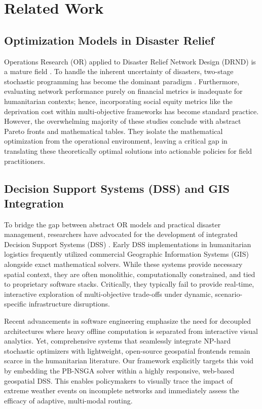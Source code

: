 \documentclass[conference]{IEEEtran}
\begin{document}
\section{Related Work}

\subsection{Optimization Models in Disaster Relief}
Operations Research (OR) applied to Disaster Relief Network Design (DRND) is a mature field \cite{altay2006or}. To handle the inherent uncertainty of disasters, two-stage stochastic programming has become the dominant paradigm \cite{tofighi2016humanitarian, Yahyaei2019}. Furthermore, evaluating network performance purely on financial metrics is inadequate for humanitarian contexts; hence, incorporating social equity metrics like the deprivation cost \cite{holguin2013appropriate} within multi-objective frameworks \cite{Zhou2017} has become standard practice. However, the overwhelming majority of these studies conclude with abstract Pareto fronts and mathematical tables. They isolate the mathematical optimization from the operational environment, leaving a critical gap in translating these theoretically optimal solutions into actionable policies for field practitioners.

\subsection{Decision Support Systems (DSS) and GIS Integration}
To bridge the gap between abstract OR models and practical disaster management, researchers have advocated for the development of integrated Decision Support Systems (DSS) \cite{Timperio2017}. Early DSS implementations in humanitarian logistics frequently utilized commercial Geographic Information Systems (GIS) alongside exact mathematical solvers. While these systems provide necessary spatial context, they are often monolithic, computationally constrained, and tied to proprietary software stacks. Critically, they typically fail to provide real-time, interactive exploration of multi-objective trade-offs under dynamic, scenario-specific infrastructure disruptions. 

Recent advancements in software engineering emphasize the need for decoupled architectures where heavy offline computation is separated from interactive visual analytics. Yet, comprehensive systems that seamlessly integrate NP-hard stochastic optimizers with lightweight, open-source geospatial frontends remain scarce in the humanitarian literature. Our framework explicitly targets this void by embedding the PB-NSGA solver within a highly responsive, web-based geospatial DSS. This enables policymakers to visually trace the impact of extreme weather events on incomplete networks and immediately assess the efficacy of adaptive, multi-modal routing.
\end{document}
